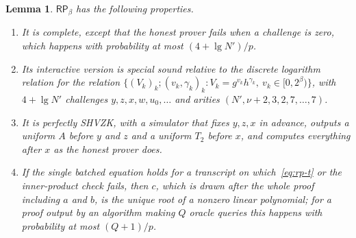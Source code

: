 \documentclass[11pt]{article}
\newtheorem{lemma}{Lemma}[section]
\theoremstyle{definition}
\theoremstyle{remark}
\newcommand{\RP}{\mathsf{RP}}
\begin{document}
\begin{lemma}\label{lem:rp}
$\RP_\beta$ has the following properties.
\begin{enumerate}[label=(\alph*)]
  \item It is complete, except that the honest prover fails when a challenge is zero, which happens with probability at most $(4+\lg N')/p$.
  \item Its interactive version is special sound relative to the discrete logarithm relation for the relation $\{(V_k)_k;(v_k,\gamma_k)_k: V_k=g^{v_k}h^{\gamma_k},\ v_k\in[0,2^\beta)\}$, with $4+\lg N'$ challenges $y,z,x,w,u_0,\ldots$ and arities $(N',\nu+2,3,2,7,\ldots,7)$.
  \item It is perfectly SHVZK, with a simulator that fixes $y,z,x$ in advance, outputs a uniform $A$ before $y$ and $z$ and a uniform $T_2$ before $x$, and computes everything after $x$ as the honest prover does.
  \item If the single batched equation holds for a transcript on which~\eqref{eq:rp-t} or the inner-product check fails, then $c$, which is drawn after the whole proof including $a$ and $b$, is the unique root of a nonzero linear polynomial; for a proof output by an algorithm making $Q$ oracle queries this happens with probability at most $(Q+1)/p$.
\end{enumerate}
\end{lemma}
\end{document}
